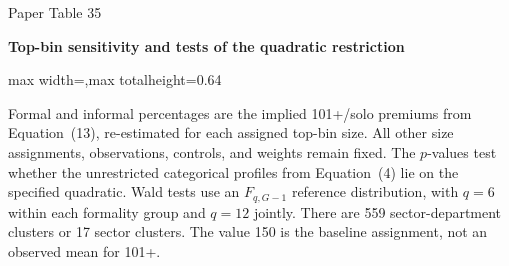 \begin{frame}{Paper Table 35}
\begin{minipage}{\textwidth}\small\textbf{Top-bin sensitivity and tests of the quadratic restriction}\end{minipage}\par\vspace{0.15cm}
\centering\begingroup\fontsize{8.5}{10}\selectfont
\setlength{\tabcolsep}{4pt}\renewcommand{\arraystretch}{1.06}
\begin{adjustbox}{max width=\textwidth,max totalheight=0.64\textheight}

\end{adjustbox}\endgroup\par\vspace{0.10cm}
{\fontsize{6.5}{7.5}\selectfont\raggedright Formal and informal percentages are the implied 101+/solo premiums from Equation~(13), re-estimated for each assigned top-bin size. All other size assignments, observations, controls, and weights remain fixed. The $p$-values test whether the unrestricted categorical profiles from Equation~(4) lie on the specified quadratic. Wald tests use an $F_{q,G-1}$ reference distribution, with $q=6$ within each formality group and $q=12$ jointly. There are 559 sector-department clusters or 17 sector clusters. The value 150 is the baseline assignment, not an observed mean for 101+.\par}
\end{frame}

